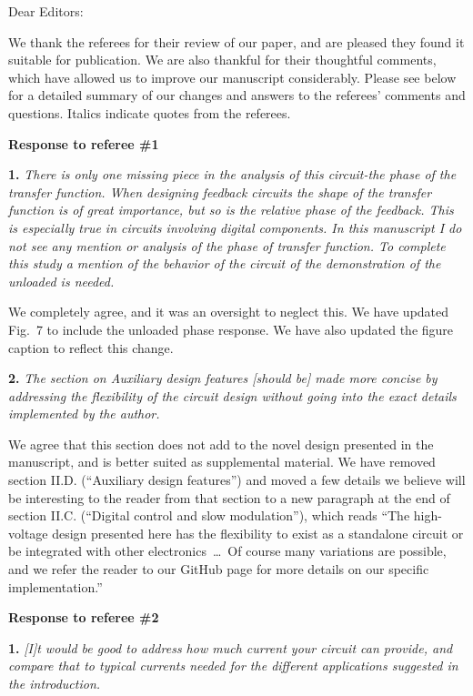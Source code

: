 \documentclass[12pt, oneside]{letter}   	%
\begin{document}
Dear Editors:

We thank the referees for their review of our paper, and are pleased they found it suitable for publication.
We are also thankful for their thoughtful comments, which have allowed us to improve our manuscript considerably.
Please see below for a detailed summary of our changes and answers to the referees' comments and questions.
Italics indicate quotes from the referees.

\textbf{Response to referee \#1}

\textbf{1.}
\textit{There is only one missing piece in the analysis of this circuit-the phase of the transfer function. 
When designing feedback circuits the shape of the transfer function is of great importance, but so is the relative phase of the feedback. 
This is especially true in circuits involving digital components. 
In this manuscript I do not see any mention or analysis of the phase of transfer function. 
To complete this study a mention of the behavior of the circuit of the demonstration of the unloaded is needed.}

We completely agree, and it was an oversight to neglect this.
We have updated Fig.~7 to include the unloaded phase response.
We have also updated the figure caption to reflect this change.


\textbf{2.}
\textit{The section on Auxiliary design features [should be] made more concise by addressing the flexibility of the circuit design without going into the exact details implemented by the author. }

We agree that this section does not add to the novel design presented in the manuscript, and is better suited as supplemental material.
We have removed section II.D. (``Auxiliary design features'') and moved a few details we believe will be interesting to the reader from that section to a new paragraph at the end of section II.C. (``Digital control and slow modulation''), which reads ``The high-voltage design presented here has the flexibility to exist as a standalone circuit or be integrated with other electronics~\ldots~Of course many variations are possible, and we refer the reader to our GitHub page for more details on our specific implementation.''

\textbf{Response to referee \#2}

\textbf{1.}
\textit{[I]t would be good to address how much current your circuit can provide, and compare that to typical currents needed for the different applications suggested in the introduction.}
\end{document}
